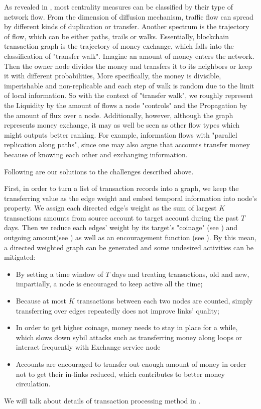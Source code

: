 As revealed in \cite{Borgatti2005}, most centrality measures can be classified by their type of network flow. From the dimension of diffusion mechanism, traffic flow can spread by different kinds of duplication or transfer. Another spectrum is the trajectory of flow, which can be either paths, trails or walks. Essentially, blockchain transaction graph is the trajectory of money exchange, which falls into the classification of "transfer walk". Imagine an amount of money enters the network. Then the owner node divides the money and transfers it to its neighbors or keep it with different probabilities, More specifically, the money is divisible, imperishable and non-replicable and each step of walk is random due to the limit of local information. So with the context of "transfer walk", we roughly represent the Liquidity by the amount of flows a node "controls" and the Propagation by the amount of flux over a node. Additionally, however, although the graph represents money exchange, it may as well be seen as other flow types which might outputs better ranking. For example, information flows with "parallel replication along paths", since one may also argue that accounts transfer money because of knowing each other and exchanging information.

Following are our solutions to the challenges described above.

First, in order to turn a list of transaction records into a graph, we keep the transferring value as the edge weight and embed temporal information into node's property. We assign each directed edge's weight as the sum of largest $K$ transactions amounts from source account to target account during the past $T$ days. Then we reduce each edges' weight by its target's "coinage" (see ) and outgoing amount(see ) as well as an encouragement function (see ). By this mean, a directed weighted graph can be generated and some undesired activities can be mitigated:
\begin{itemize}
	\item By setting a time window of $T$ days and treating transactions, old and new, impartially, a node is encouraged to keep active all the time;
	\item Because at most $K$ transactions between each two nodes are counted, simply transferring over edges repeatedly does not improve links' quality;
	\item In order to get higher coinage, money needs to stay in place for a while, which slows down sybil attacks such as transferring money along loops or interact frequently with Exchange service node
	\item Accounts are encouraged to transfer out enough amount of money in order not to get their in-links reduced, which contributes to better money circulation.
\end{itemize}
We will talk about details of transaction processing method in .

